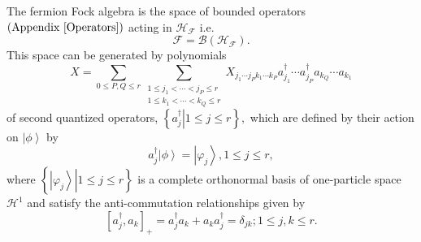 \documentclass[aps,preprint]{revtex4}%
\begin{document}
The fermion Fock algebra is the space of bounded operators $\left(
\text{Appendix \ref{Operators}}\right)  $ acting in $\mathcal{H}_{\mathcal{F}%
}$ i.e.
\begin{equation}
\mathcal{F}=\mathcal{B}\left(  \mathcal{H}_{\mathcal{F}}\right)  .
\end{equation}
This space can be generated by polynomials
\begin{equation}
X=\sum_{0\leq P,Q\leq r}\sum_{\substack{1\leq j_{1}<\cdots<j_{P}\leq r\\1\leq
k_{1}<\cdots<k_{Q}\leq r}}X_{j_{1}\cdots j_{P}k_{1}\cdots k_{P}}a_{j_{1}%
}^{\dagger}\cdots a_{j_{P}}^{\dagger}a_{k_{Q}}\cdots a_{k_{1}}%
\end{equation}
of second quantized operators, $\left\{  \left.  a_{j}^{\dagger}\right\vert
1\leq j\leq r\right\}  ,$ which are defined by their action on $\left\vert
\phi\right\rangle $ by
\begin{equation}
a_{j}^{\dagger}\left\vert \phi\right\rangle =\left\vert \varphi_{j}%
\right\rangle ,1\leq j\leq r,
\end{equation}
where $\left\{  \left.  \left\vert \varphi_{j}\right\rangle \right\vert 1\leq
j\leq r\right\}  $ is a complete orthonormal basis of one-particle space
$\mathcal{H}^{1}$ and satisfy the anti-commutation relationships given by
\begin{equation}
\left[  a_{j}^{\dagger},a_{k}\right]  _{+}=a_{j}^{\dagger}a_{k}+a_{k}%
a_{j}^{\dagger}=\delta_{jk};1\leq j,k\leq r. \label{CAR}%
\end{equation}
\end{document}
